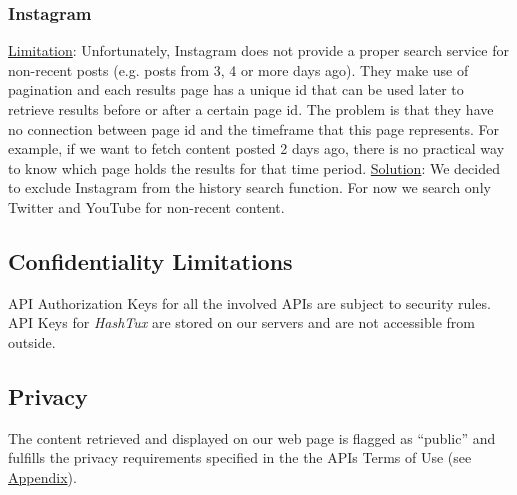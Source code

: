 \subsubsection{Instagram}
\underline{Limitation}: Unfortunately, Instagram does not provide a proper
search service for non-recent posts (e.g. posts from 3, 4 or more days ago).
They make use of pagination and each results page has a unique id that can be
used later to retrieve results before or after a certain page id. The problem is
that they have no connection between page id and the timeframe that this page
represents. For example, if we want to fetch content posted 2 days ago, there is
no practical way to know which page holds the results for that time period.
\newline
\underline{Solution}: We decided to exclude Instagram from the history search
function. For now we search only Twitter and YouTube for non-recent content.

\subsection{Confidentiality Limitations}
API Authorization Keys for all the involved APIs are subject to security rules.
API Keys for \textit{HashTux} are stored on our servers and are not accessible
from outside.

\subsection{Privacy}
The content retrieved and displayed on our web page is flagged as “public” and
fulfills the privacy requirements specified in the the APIs Terms of Use
(see \hyperlink{refapis}{Appendix}).